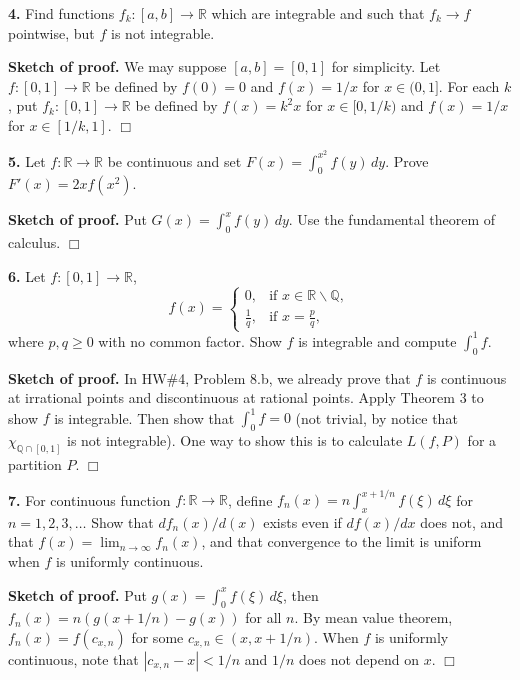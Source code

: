 \documentclass{article}
\begin{document}
    \textbf{4.} Find functions $f_k :[a,b] \to \mathbb{R}$ which are
integrable and such that $f_k \to f$ pointwise, but $f$ is not
integrable.

    \textbf{Sketch of proof.} We may suppose $[a,b] = [0,1]$ for simplicity.
Let $f:[0,1]\to \mathbb{R}$ be defined by $f(0) = 0$ and $f(x) = 1/x$
for $x\in (0,1]$. For each $k$, put $f_k:[0,1] \to \mathbb{R}$ be
defined by $f(x) = k^2x$ for $x\in [0,1/k)$ and $f(x) =1/x$ for
$x\in [1/k,1]$. $\Box$

    \textbf{5.} Let $f:\mathbb{R} \to \mathbb{R}$ be continuous and set
$F(x) = \int_0^{x^2} f(y)\, dy$. Prove $F'(x) = 2xf(x^2)$.

    \textbf{Sketch of proof.} Put $G(x) = \int_0^x f(y)\,dy$. Use the
fundamental theorem of calculus. $\Box$

    \textbf{6.} Let $f:[0,1] \to \mathbb{R}$, \[f(x) = \begin{cases}
0, & \text{if } x\in \mathbb{R}\backslash \mathbb{Q},\\
\frac{1}{q}, & \text{if } x = \frac{p}{q},
\end{cases}\] where $p,q\ge 0$ with no common factor. Show $f$ is
integrable and compute $\int_0^1 f$.

    \textbf{Sketch of proof.} In HW\#4, Problem 8.b, we already prove that
$f$ is continuous at irrational points and discontinuous at rational
points. Apply Theorem 3 to show $f$ is integrable. Then show that
$\int_0^1 f = 0$ (not trivial, by notice that
$\chi_{\mathbb{Q}\cap [0,1]}$ is not integrable). One way to show this
is to calculate $L(f,P)$ for a partition $P$. $\Box$

    \textbf{7.} For continuous function $f:\mathbb{R} \to \mathbb{R}$,
define $f_n(x) = n\int_x^{x+1/n}f(\xi)\,d\xi$ for $n=1,2,3,\ldots$ Show
that $df_n(x)/d(x)$ exists even if $df(x)/dx$ does not, and that
$f(x) = \lim_{n\to \infty}f_n(x)$, and that convergence to the limit is
uniform when $f$ is uniformly continuous.

    \textbf{Sketch of proof.} Put $g(x) = \int_0^x f(\xi)\,d\xi$, then
$f_n(x) = n(g(x+1/n)-g(x))$ for all $n$. By mean value theorem,
$f_n(x)  =f(c_{x,n})$ for some $c_{x,n}\in (x, x+1/n)$. When $f$ is
uniformly continuous, note that $|c_{x,n} - x| < 1/n$ and $1/n$ does not
depend on $x$. $\Box$


    
    
    
    
\end{document}
